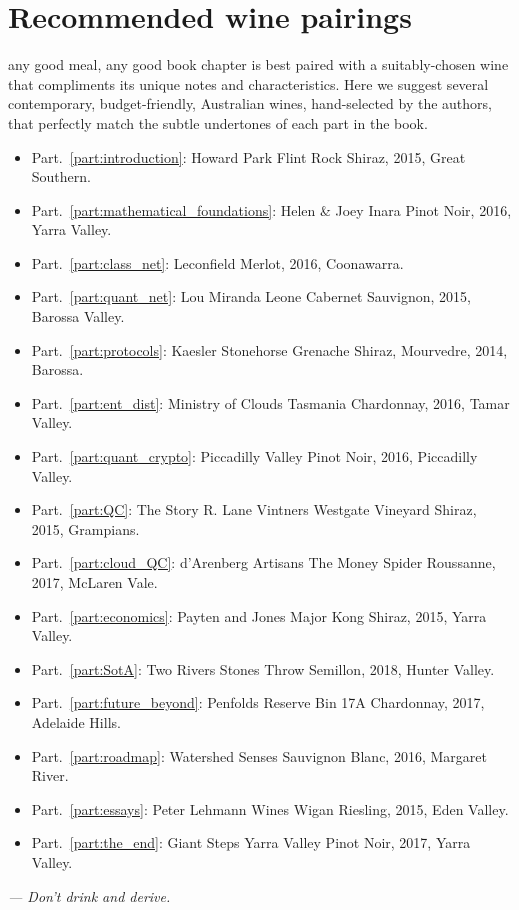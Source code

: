 \section*{Recommended wine pairings}

 any good meal, any good book chapter is best paired with a suitably-chosen wine that compliments its unique notes and characteristics. Here we suggest several contemporary, budget-friendly, Australian wines, hand-selected by the authors, that perfectly match the subtle undertones of each part in the book.

\begin{itemize}
\item Part.~\ref{part:introduction}: Howard Park Flint Rock Shiraz, 2015, Great Southern.
\item Part.~\ref{part:mathematical_foundations}: Helen \& Joey Inara Pinot Noir, 2016, Yarra Valley.
\item Part.~\ref{part:class_net}: Leconfield Merlot, 2016, Coonawarra.
\item Part.~\ref{part:quant_net}: Lou Miranda Leone Cabernet Sauvignon, 2015, Barossa Valley.
\item Part.~\ref{part:protocols}: Kaesler Stonehorse Grenache Shiraz, Mourvedre, 2014, Barossa.
\item Part.~\ref{part:ent_dist}: Ministry of Clouds Tasmania Chardonnay, 2016, Tamar Valley.
\item Part.~\ref{part:quant_crypto}: Piccadilly Valley Pinot Noir, 2016, Piccadilly Valley.
\item Part.~\ref{part:QC}: The Story R. Lane Vintners Westgate Vineyard Shiraz, 2015, Grampians.
\item Part.~\ref{part:cloud_QC}: d'Arenberg Artisans The Money Spider Roussanne, 2017, McLaren Vale.
\item Part.~\ref{part:economics}: Payten and Jones Major Kong Shiraz, 2015, Yarra Valley.
\item Part.~\ref{part:SotA}: Two Rivers Stones Throw Semillon, 2018, Hunter Valley.
\item Part.~\ref{part:future_beyond}: Penfolds Reserve Bin 17A Chardonnay, 2017, Adelaide Hills.
\item Part.~\ref{part:roadmap}: Watershed Senses Sauvignon Blanc, 2016, Margaret River.
\item Part.~\ref{part:essays}: Peter Lehmann Wines Wigan Riesling, 2015, Eden Valley.
\item Part.~\ref{part:the_end}: Giant Steps Yarra Valley Pinot Noir, 2017, Yarra Valley.
\end{itemize}

\textit{--- Don't drink and derive.}


